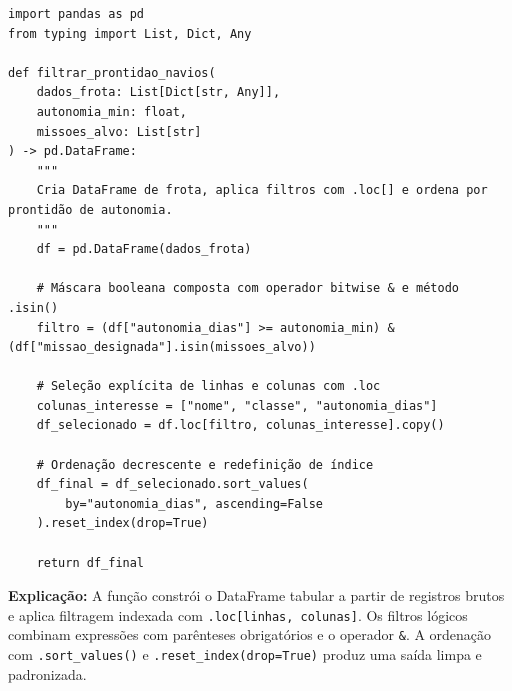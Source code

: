 \ifmostrarGabarito
\begin{verbatim}
import pandas as pd
from typing import List, Dict, Any

def filtrar_prontidao_navios(
    dados_frota: List[Dict[str, Any]],
    autonomia_min: float,
    missoes_alvo: List[str]
) -> pd.DataFrame:
    """
    Cria DataFrame de frota, aplica filtros com .loc[] e ordena por prontidão de autonomia.
    """
    df = pd.DataFrame(dados_frota)
    
    # Máscara booleana composta com operador bitwise & e método .isin()
    filtro = (df["autonomia_dias"] >= autonomia_min) & (df["missao_designada"].isin(missoes_alvo))
    
    # Seleção explícita de linhas e colunas com .loc
    colunas_interesse = ["nome", "classe", "autonomia_dias"]
    df_selecionado = df.loc[filtro, colunas_interesse].copy()
    
    # Ordenação decrescente e redefinição de índice
    df_final = df_selecionado.sort_values(
        by="autonomia_dias", ascending=False
    ).reset_index(drop=True)
    
    return df_final
\end{verbatim}

\textbf{Explicação:}
A função constrói o DataFrame tabular a partir de registros brutos e aplica filtragem indexada com \texttt{.loc[linhas, colunas]}. Os filtros lógicos combinam expressões com parênteses obrigatórios e o operador \texttt{\&}. A ordenação com \texttt{.sort\_values()} e \texttt{.reset\_index(drop=True)} produz uma saída limpa e padronizada.
\fi
